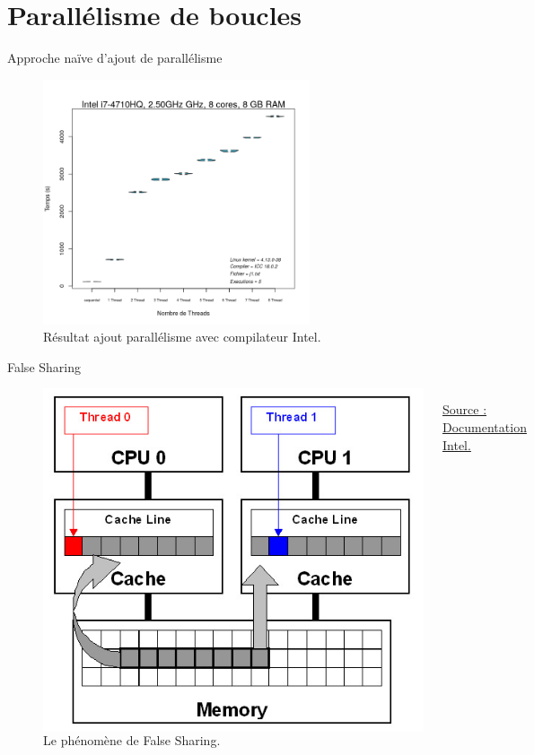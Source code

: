 \documentclass{beamer}
\begin{document}
\section{Parallélisme de boucles}

\begin{frame}{Approche naïve d'ajout de parallélisme}
	\begin{figure}
      \includegraphics[width=0.7\textwidth]{intel_parallel_naif.png}
      \caption{Résultat ajout parallélisme avec compilateur Intel.\label{Fig:naif_intel}}
  
	\end{figure}
\end{frame}

\begin{frame}{False Sharing}
	\begin{figure}
	\begin{columns}
      \includegraphics[width=\textwidth]{false_sharing.jpg}
      \caption{Le phénomène de False Sharing.\label{Fig:false_sharing}}{\href{https://software.intel.com/en-us/articles/avoiding-and-identifying-false-sharing-among-threads}{Source : Documentation Intel.}}
    \end{columns}	
    \end{figure}
\end{frame}
\end{document}
